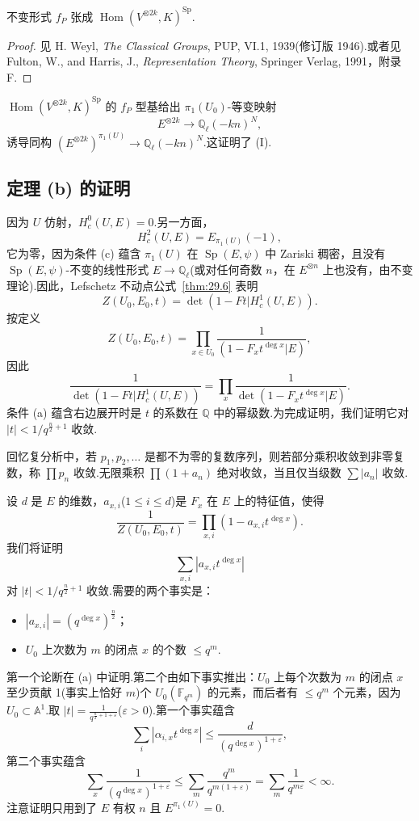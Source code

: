 \begin{proposition}\label{prop:30.11}
不变形式 $f_P$ 张成 $\operatorname{Hom}(V^{\otimes 2k}, K)^{\operatorname{Sp}}$.
\end{proposition}

\begin{proof}
见 H. Weyl, \emph{The Classical Groups}, PUP, VI.1, 1939(修订版 1946).或者见 Fulton, W., and Harris, J., \emph{Representation Theory}, Springer Verlag, 1991，附录 F.
\end{proof}

$\operatorname{Hom}(V^{\otimes 2k}, K)^{\operatorname{Sp}}$ 的 $f_P$ 型基给出 $\pi_1(U_0)$-等变映射
\[
E^{\otimes 2k} \to \mathbb{Q}_{\ell}(-kn)^{N},
\]
诱导同构 $(E^{\otimes 2k})^{\pi_1(U)} \to \mathbb{Q}_{\ell}(-kn)^{N}$.这证明了 (I).

\subsection*{定理 (b) 的证明}

因为 $U$ 仿射，$H^{0}_{c}(U, E) = 0$.另一方面，
\[
H^{2}_{c}(U, E) = E_{\pi_1(U)}(-1),
\]
它为零，因为条件 (c) 蕴含 $\pi_1(U)$ 在 $\operatorname{Sp}(E, \psi)$ 中 Zariski 稠密，且没有 $\operatorname{Sp}(E, \psi)$-不变的线性形式 $E \to \mathbb{Q}_{\ell}$(或对任何奇数 $n$，在 $E^{\otimes n}$ 上也没有，由不变理论).因此，Lefschetz 不动点公式~\ref{thm:29.6} 表明
\[
Z(U_0, E_0, t) = \det(1 - Ft|H^{1}_{c}(U, E)).
\]
按定义
\[
Z(U_0, E_0, t) = \prod_{x \in U_0} \frac{1}{(1 - F_x t^{\deg x}|E)},
\]
因此
\[
\frac{1}{\det(1 - Ft|H^{1}_{c}(U, E))} = \prod_{x} \frac{1}{\det(1 - F_x t^{\deg x}|E)}.
\]
条件 (a) 蕴含右边展开时是 $t$ 的系数在 $\mathbb{Q}$ 中的幂级数.为完成证明，我们证明它对 $|t| < 1/q^{\frac{n}{2}+1}$ 收敛.

回忆复分析中，若 $p_1, p_2, \ldots$ 是都不为零的复数序列，则若部分乘积收敛到非零复数，称 $\prod p_n$ 收敛.无限乘积 $\prod (1 + a_n)$ 绝对收敛，当且仅当级数 $\sum |a_n|$ 收敛.

设 $d$ 是 $E$ 的维数，$a_{x, i}$($1 \leq i \leq d$)是 $F_x$ 在 $E$ 上的特征值，使得
\[
\frac{1}{Z(U_0, E_0, t)} = \prod_{x, i} (1 - a_{x, i} t^{\deg x}).
\]
我们将证明
\[
\sum_{x, i} |a_{x, i} t^{\deg x}|
\]
对 $|t| < 1/q^{\frac{n}{2}+1}$ 收敛.需要的两个事实是：
\begin{itemize}
  \item $|a_{x, i}| = (q^{\deg x})^{\frac{n}{2}}$；
  \item $U_0$ 上次数为 $m$ 的闭点 $x$ 的个数 $\leq q^{m}$.
\end{itemize}
第一个论断在 (a) 中证明.第二个由如下事实推出：$U_0$ 上每个次数为 $m$ 的闭点 $x$ 至少贡献 1(事实上恰好 $m$)个 $U_0(\mathbb{F}_{q^m})$ 的元素，而后者有 $\leq q^{m}$ 个元素，因为 $U_0 \subset \mathbb{A}^{1}$.取 $|t| = \frac{1}{q^{\frac{n}{2}+1+\varepsilon}}$($\varepsilon > 0$).第一个事实蕴含
\[
\sum_{i} |\alpha_{i, x} t^{\deg x}| \leq \frac{d}{(q^{\deg x})^{1+\varepsilon}},
\]
第二个事实蕴含
\[
\sum_{x} \frac{1}{(q^{\deg x})^{1+\varepsilon}} \leq \sum_{m} \frac{q^{m}}{q^{m(1+\varepsilon)}} = \sum_{m} \frac{1}{q^{m\varepsilon}} < \infty.
\]
注意证明只用到了 $E$ 有权 $n$ 且 $E^{\pi_1(U)} = 0$.

